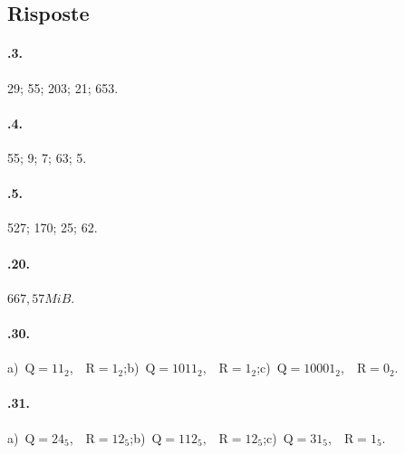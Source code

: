 \subsection{Risposte}

\paragraph{\thechapter.3.} 29; 55; 203; 21; 653.

\paragraph{\thechapter.4.} 55; 9; 7; 63; 5.

\paragraph{\thechapter.5.} 527; 170; 25; 62.

\paragraph{\thechapter.20.} $667,57\unit{MiB}$.

\paragraph{\thechapter.30.}
a)~$\text{Q}=11_2$,~~$\text{R}=1_2$;\quad b)~$\text{Q}=1011_2$,~~$\text{R}=1_2$;\quad c)~$\text{Q}=10001_2$,~~$\text{R}=0_2$.

\paragraph{\thechapter.31.}
a)~$\text{Q}=24_5$,~~$\text{R}=12_5$;\quad b)~$\text{Q}=112_5$,~~$\text{R}=12_5$;\quad c)~$\text{Q}=31_5$,~~$\text{R}=1_5$.
